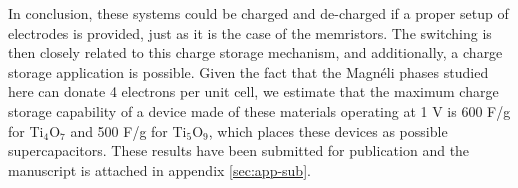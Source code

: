 In conclusion, these systems could be charged and de-charged if a proper setup of electrodes is provided, just as it is the case of the memristors. The switching is then closely related to this charge storage mechanism, and additionally, a charge storage application is possible. Given the fact that the Magnéli phases studied here can donate 4 electrons per unit cell, we estimate that the maximum charge storage capability of a device made of these materials operating at 1 V is 600 F/g for Ti$_4$O$_7$ and 500 F/g for Ti$_5$O$_9$, which places these devices as possible supercapacitors. These results have been submitted for publication and the manuscript is attached in appendix \ref{sec:app-sub}.
